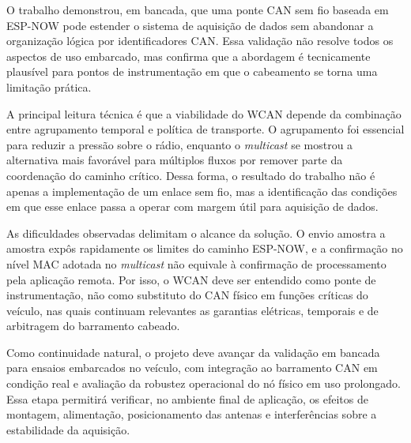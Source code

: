 O trabalho demonstrou, em bancada, que uma ponte CAN sem fio baseada em
ESP-NOW pode estender o sistema de aquisição de dados sem abandonar a organização
lógica por identificadores CAN. Essa validação não resolve todos os aspectos de
uso embarcado, mas confirma que a abordagem é tecnicamente plausível para pontos
de instrumentação em que o cabeamento se torna uma limitação prática.

A principal leitura técnica é que a viabilidade do WCAN depende da combinação
entre agrupamento temporal e política de transporte. O agrupamento foi essencial
para reduzir a pressão sobre o rádio, enquanto o \emph{multicast} se mostrou a
alternativa mais favorável para múltiplos fluxos por remover parte da
coordenação do caminho crítico. Dessa forma, o resultado do trabalho não é apenas
a implementação de um enlace sem fio, mas a identificação das condições em que
esse enlace passa a operar com margem útil para aquisição de dados.

As dificuldades observadas delimitam o alcance da solução. O envio amostra a
amostra expôs rapidamente os limites do caminho ESP-NOW, e a confirmação no
nível MAC adotada no \emph{multicast} não equivale à confirmação de
processamento pela aplicação remota. Por isso, o WCAN deve ser entendido como
ponte de instrumentação, não como substituto do CAN físico em funções críticas
do veículo, nas quais continuam relevantes as garantias elétricas, temporais e
de arbitragem do barramento cabeado.

Como continuidade natural, o projeto deve avançar da validação em bancada para
ensaios embarcados no veículo, com integração ao barramento CAN em condição real
e avaliação da robustez operacional do nó físico em uso prolongado. Essa etapa
permitirá verificar, no ambiente final de aplicação, os efeitos de montagem,
alimentação, posicionamento das antenas e interferências sobre a estabilidade da
aquisição.
